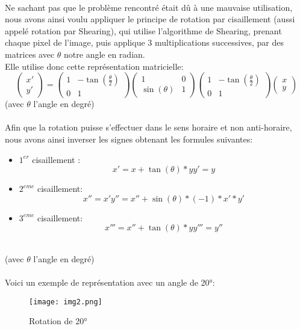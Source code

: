 \documentclass{article}
\begin{document}
\paragraph{}
Ne sachant pas que le problème rencontré était dû à une mauvaise utilisation, nous avons ainsi voulu appliquer le principe de rotation par cisaillement (aussi appelé rotation par Shearing), qui utilise l’algorithme de Shearing, prenant chaque pixel de l’image, puis applique 3 multiplications successives, par des matrices avec $\theta$ notre angle en radian. \\
Elle utilise donc cette représentation matricielle:
$$
\left(\begin{array}{cc} x' \\ y' \end{array}\right) = \left(\begin{array}{cc}
   1  & -\tan(\frac{\theta}{2}) \\
   0  & 1
\end{array}\right) \left(\begin{array}{cc}
   1  &  0\\
   \sin(\theta)  & 1
\end{array}\right)\left(\begin{array}{cc}
    1 &  -\tan(\frac{\theta}{2})\\
    0 & 1
\end{array}\right)\left(\begin{array}{cc} x \\ y \end{array}\right)
$$
(avec $\theta$ l’angle en degré)
\paragraph{}
Afin que la rotation puisse s’effectuer dans le sens horaire et non anti-horaire, nous avons ainsi inverser les signes obtenant les formules suivantes:
\begin{itemize}
    \item $1^{er}$ cisaillement :
    $$
    x' = x + \tan(\theta) * y
    y' = y
    $$
    \item $2^{eme}$ cisaillement:
    $$
    x'' = x'
    y'' = x'' + \sin(\theta) * (-1) * x' * y'
    $$
    \item $3^{eme}$ cisaillement:
    $$
    x''' = x'' + \tan(\theta) * y
    y''' = y''
    $$
\end{itemize}\\
(avec $\theta$ l’angle en degré)\\\\
Voici un exemple de représentation avec un angle de 20°:
\begin{figure}[H]
    \centering
    \texttt{[image: img2.png]}
    \caption{Rotation de 20°}
\end{figure}
\end{document}
